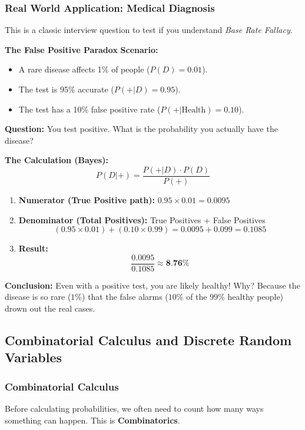 \subsubsection{Real World Application: Medical Diagnosis}
This is a classic interview question to test if you understand \textit{Base Rate Fallacy}.

\begin{example}{\textbf{The False Positive Paradox}}
\textbf{Scenario:}
\begin{itemize}
    \item A rare disease affects 1\% of people ($P(D) = 0.01$).
    \item The test is 95\% accurate ($P(+|D) = 0.95$).
    \item The test has a 10\% false positive rate ($P(+|\text{Health}) = 0.10$).
\end{itemize}
\textbf{Question:} You test positive. What is the probability you actually have the disease?

\textbf{The Calculation (Bayes):}
\[ P(D|+) = \frac{P(+|D) \cdot P(D)}{P(+)} \]

\begin{enumerate}
    \item \textbf{Numerator (True Positive path):} $0.95 \times 0.01 = 0.0095$
    \item \textbf{Denominator (Total Positives):}
    True Positives + False Positives
    \[ (0.95 \times 0.01) + (0.10 \times 0.99) = 0.0095 + 0.099 = 0.1085 \]
    \item \textbf{Result:}
    \[ \frac{0.0095}{0.1085} \approx \textbf{8.76\%} \]
\end{enumerate}

\textbf{Conclusion:} Even with a positive test, you are likely healthy! Why? Because the disease is so rare ($1\%$) that the false alarms ($10\%$ of the $99\%$ healthy people) drown out the real cases.
\end{example}



\subsection{Combinatorial Calculus and Discrete Random Variables}

\subsubsection{Combinatorial Calculus}

Before calculating probabilities, we often need to count how many ways something can happen. This is \textbf{Combinatorics}.

